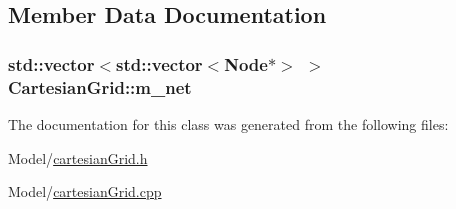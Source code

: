 \subsection{Member Data Documentation}
\hypertarget{class_cartesian_grid_a6c09b38347d2f1107ce12d7aef805e80}{
\subsubsection[{m\+\_\+net}]{\setlength{\rightskip}{0pt plus 5cm}std\+::vector$<$std\+::vector$<${\bf Node}$\ast$$>$ $>$ Cartesian\+Grid\+::m\+\_\+net}}\label{class_cartesian_grid_a6c09b38347d2f1107ce12d7aef805e80}


The documentation for this class was generated from the following files\+:\begin{DoxyCompactItemize}
\item 
Model/\hyperlink{cartesian_grid_8h}{cartesian\+Grid.\+h}\item 
Model/\hyperlink{cartesian_grid_8cpp}{cartesian\+Grid.\+cpp}\end{DoxyCompactItemize}
